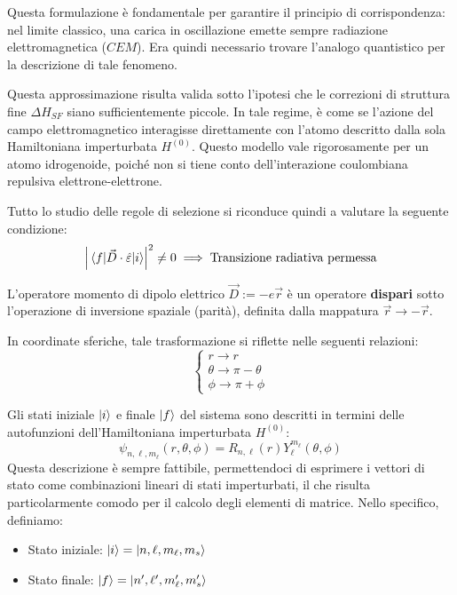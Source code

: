 Questa formulazione è fondamentale per garantire il principio di corrispondenza: nel limite classico, una carica in oscillazione emette sempre radiazione elettromagnetica (\( CEM \)). Era quindi necessario trovare l'analogo quantistico per la descrizione di tale fenomeno.

Questa approssimazione risulta valida sotto l'ipotesi che le correzioni di struttura fine \( \Delta H_{SF} \) siano sufficientemente piccole. In tale regime, è come se l'azione del campo elettromagnetico interagisse direttamente con l'atomo descritto dalla sola Hamiltoniana imperturbata \( H^{(0)} \). Questo modello vale rigorosamente per un atomo idrogenoide, poiché non si tiene conto dell'interazione coulombiana repulsiva elettrone-elettrone.

Tutto lo studio delle regole di selezione si riconduce quindi a valutare la seguente condizione:
\begin{equation}
    \label{eq: transazione_radiativa}
    \abs{\mel{f}{\vec{D} \cdot \hat{\varepsilon}}{i}}^2 \neq 0 \implies \text{Transizione radiativa permessa}
\end{equation}

L'operatore momento di dipolo elettrico \(\vec{D} := -e\vec{r}\) è un operatore \textbf{dispari} sotto l'operazione di inversione spaziale (parità), definita dalla mappatura \(\vec{r} \longrightarrow -\vec{r}\). 

In coordinate sferiche, tale trasformazione si riflette nelle seguenti relazioni:
\begin{equation}
    \begin{cases}
        r \longrightarrow r \\
        \theta \longrightarrow \pi - \theta \\
        \phi \longrightarrow \pi + \phi
    \end{cases}
\end{equation}

Gli stati iniziale \(\ket{i}\) e finale \(\ket{f}\) del sistema sono descritti in termini delle autofunzioni dell'Hamiltoniana imperturbata \(H^{(0)}\):
\begin{equation}
    \psi_{n,\ell,m_\ell}(r, \theta, \phi) = R_{n,\ell}(r) Y_{\ell}^{m_{\ell}}(\theta, \phi)
\end{equation}
Questa descrizione è sempre fattibile, permettendoci di esprimere i vettori di stato come combinazioni lineari di stati imperturbati, il che risulta particolarmente comodo per il calcolo degli elementi di matrice. Nello specifico, definiamo:
\begin{itemize}
    \item Stato iniziale: \(\ket{i} = \ket{n, \ell, m_{\ell}, m_s}\)
    \item Stato finale: \(\ket{f} = \ket{n', \ell', m_{\ell}', m_s'}\)
\end{itemize}

